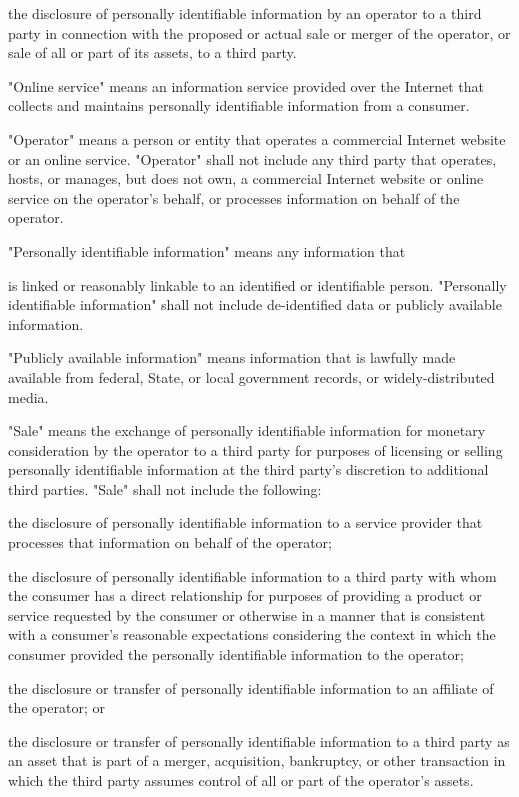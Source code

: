      the disclosure of personally identifiable information by an operator to a third party in connection with the proposed or actual sale or merger of the operator, or sale of all or part of its assets, to a third party.

     "Online service" means an information service provided over the Internet that collects and maintains personally identifiable information from a consumer.

     "Operator" means a person or entity that operates a commercial Internet website or an online service. "Operator" shall not include any third party that operates, hosts, or manages, but does not own, a commercial Internet website or online service on the operator's behalf, or processes information on behalf of the operator.

     "Personally identifiable information" means any information that

is linked or reasonably linkable to an identified or identifiable person. "Personally identifiable information" shall not include de-identified data or publicly available information.

     "Publicly available information" means information that is lawfully made available from federal, State, or local government records, or widely-distributed media.

     "Sale" means the exchange of personally identifiable information for monetary consideration by the operator to a third party for purposes of licensing or selling personally identifiable information at the third party's discretion to additional third parties. "Sale" shall not include the following:

     the disclosure of personally identifiable information to a service provider that processes that information on behalf of the operator;

     the disclosure of personally identifiable information to a third party with whom the consumer has a direct relationship for purposes of providing a product or service requested by the consumer or otherwise in a manner that is consistent with a consumer's reasonable expectations considering the context in which the consumer provided the personally identifiable information to the operator;

     the disclosure or transfer of personally identifiable information to an affiliate of the operator; or

     the disclosure or transfer of personally identifiable information to a third party as an asset that is part of a merger, acquisition, bankruptcy, or other transaction in which the third party assumes control of all or part of the operator's assets.

